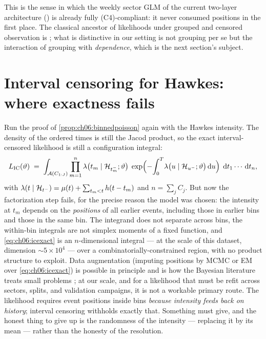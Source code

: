 This is the sense in which the weekly sector GLM of the current
two-layer architecture () is already fully
(C4)-compliant: it never consumed positions in the first place. The
classical ancestor of likelihoods under grouped and censored observation is
\citet{turnbull1976}; what is distinctive in our setting is not grouping
per se but the interaction of grouping with \emph{dependence}, which is the
next section's subject.

\section{Interval censoring for Hawkes: where exactness fails}\label{ch06:sec:ichawkes}

Run the proof of \cref{prop:ch06:binnedpoisson} again with the Hawkes
intensity. The density of the ordered times is still the Jacod product, so
the exact interval-censored likelihood is still a configuration integral:
\begin{equation}\label{eq:ch06:icexact}
L_{\mathrm{IC}}(\vartheta)
 \;=\;
 \int_{\mathcal{A}(C_{1:J})}
 \prod_{m=1}^{n} \lambda\big(t_m \mid \mathcal{H}_{t_m^-};\vartheta\big)\;
 \exp\!\Big({-}\!\int_0^{T}\!\lambda\big(u \mid \mathcal{H}_{u^-};
 \vartheta\big)\,\mathrm{d} u\Big)\;
 \,\mathrm{d} t_1 \cdots \,\mathrm{d} t_n,
\end{equation}
with $\lambda(t\mid\mathcal{H}_{t^-}) = \mu(t) + \sum_{t_m < t}h(t-t_m)$ and
$n = \sum_j C_j$. But now the factorization step fails, for the precise
reason the model was chosen: the intensity at $t_m$ depends on the
\emph{positions} of all earlier events, including those in earlier bins and
those in the same bin. The integrand does not separate across bins, the
within-bin integrals are not simplex moments of a fixed function, and
\cref{eq:ch06:icexact} is an $n$-dimensional integral --- at the scale of
this dataset, dimension $\sim 5\times 10^4$ --- over a
combinatorially-constrained region, with no product structure to exploit.
Data augmentation (imputing positions by MCMC or EM over
\cref{eq:ch06:icexact}) is possible in principle and is how the Bayesian
literature treats small problems \citep{rasmussen2013}; at our scale, and
for a likelihood that must be refit across sectors, splits, and validation
campaigns, it is not a workable primary route. The likelihood requires
event positions inside bins \emph{because intensity feeds back on
history}; interval censoring withholds exactly that. Something must give,
and the honest thing to give up is the randomness of the intensity ---
replacing it by its mean --- rather than the honesty of the resolution.

